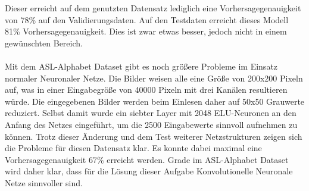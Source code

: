 \documentclass[11pt,bibliography=totocnumbered]{scrartcl}
\begin{document}
\vspace*{-5mm}
Dieser erreicht auf dem genutzten Datensatz lediglich eine Vorhersagegenauigkeit von 78\% auf den Validierungsdaten. Auf den Testdaten erreicht dieses Modell 81\% Vorhersagegenauigkeit. Dies ist zwar etwas besser, jedoch nicht in einem gewünschten Bereich.
\\\\
Mit dem ASL-Alphabet Dataset gibt es noch größere Probleme im Einsatz normaler Neuronaler Netze. Die Bilder weisen alle eine Größe von 200x200 Pixeln auf, was in einer Eingabegröße von 40000 Pixeln mit drei Kanälen resultieren würde. Die eingegebenen Bilder werden beim Einlesen daher auf 50x50 Grauwerte reduziert. Selbst damit wurde ein siebter Layer mit 2048 ELU-Neuronen an den Anfang des Netzes eingeführt, um die 2500 Eingabewerte sinnvoll aufnehmen zu können. Trotz dieser Änderung und dem Test weiterer Netzstrukturen zeigen sich die Probleme für diesen Datensatz klar. Es konnte dabei maximal eine Vorhersagegenauigkeit 67\% erreicht werden. Grade im ASL-Alphabet Dataset wird daher klar, dass für die Lösung dieser Aufgabe Konvolutionelle Neuronale Netze sinnvoller sind.
\end{document}
